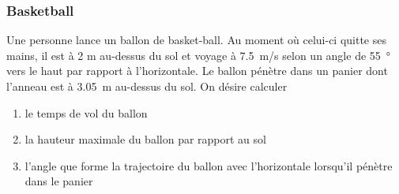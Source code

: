 \documentclass{beamer}
\begin{document}
\begin{frame}
  \frametitle{Basketball}

  Une personne lance un ballon de basket-ball.  Au moment où celui-ci quitte
  ses mains, il est à 2 m au-dessus du sol et voyage à \SI{7.5}{m/s} selon un
  angle de \SI{55}{\degree} vers le haut par rapport à l'horizontale.  Le
  ballon pénètre dans un panier dont l'anneau est à \SI{3.05}{m} au-dessus du
  sol.  On désire calculer

  \begin{enumerate}
    \item le temps de vol du ballon
    \item la hauteur maximale du ballon par rapport au sol
    \item l'angle que forme la trajectoire du ballon avec l'horizontale lorsqu'il
          pénètre dans le panier
  \end{enumerate}

\end{frame}
\end{document}
